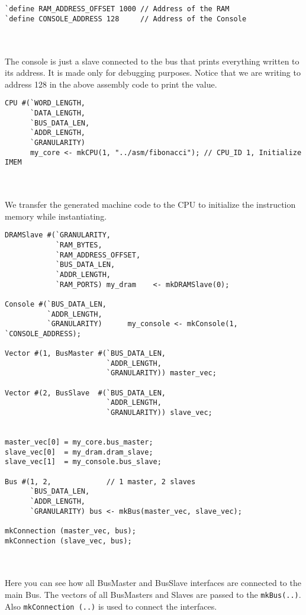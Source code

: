 \begin{paper}
\begin{verbatim}
`define RAM_ADDRESS_OFFSET 1000 // Address of the RAM
`define CONSOLE_ADDRESS 128     // Address of the Console
\end{verbatim}\\\\
\nointend The console is just a slave connected to the bus that prints everything written to its address. It is made only for debugging purposes. Notice that we are writing to address 128 in the above assembly code to print the value.
\begin{verbatim}
CPU #(`WORD_LENGTH,
      `DATA_LENGTH, 
      `BUS_DATA_LEN, 
      `ADDR_LENGTH, 
      `GRANULARITY) 
      my_core <- mkCPU(1, "../asm/fibonacci"); // CPU_ID 1, Initialize IMEM
\end{verbatim}\\\\
\nointend We transfer the generated machine code to the CPU to initialize the instruction memory while instantiating.
\begin{verbatim}
DRAMSlave #(`GRANULARITY, 
            `RAM_BYTES, 
            `RAM_ADDRESS_OFFSET, 
            `BUS_DATA_LEN, 
            `ADDR_LENGTH,
            `RAM_PORTS) my_dram    <- mkDRAMSlave(0);

Console #(`BUS_DATA_LEN,
          `ADDR_LENGTH,
          `GRANULARITY)      my_console <- mkConsole(1, `CONSOLE_ADDRESS);

Vector #(1, BusMaster #(`BUS_DATA_LEN, 
                        `ADDR_LENGTH, 
                        `GRANULARITY)) master_vec;

Vector #(2, BusSlave  #(`BUS_DATA_LEN, 
                        `ADDR_LENGTH, 
                        `GRANULARITY)) slave_vec;


master_vec[0] = my_core.bus_master;
slave_vec[0]  = my_dram.dram_slave;
slave_vec[1]  = my_console.bus_slave;

Bus #(1, 2,             // 1 master, 2 slaves
      `BUS_DATA_LEN, 
      `ADDR_LENGTH, 
      `GRANULARITY) bus <- mkBus(master_vec, slave_vec);

mkConnection (master_vec, bus);
mkConnection (slave_vec, bus);
\end{verbatim}\\\\
\nointend Here you can see how all BusMaster and BusSlave interfaces are connected to the main Bus. The vectors of all BusMasters and Slaves are passed to the \texttt{mkBus(..)}. Also \texttt{mkConnection (..)} is used to connect the interfaces. \\\\
\end{paper}